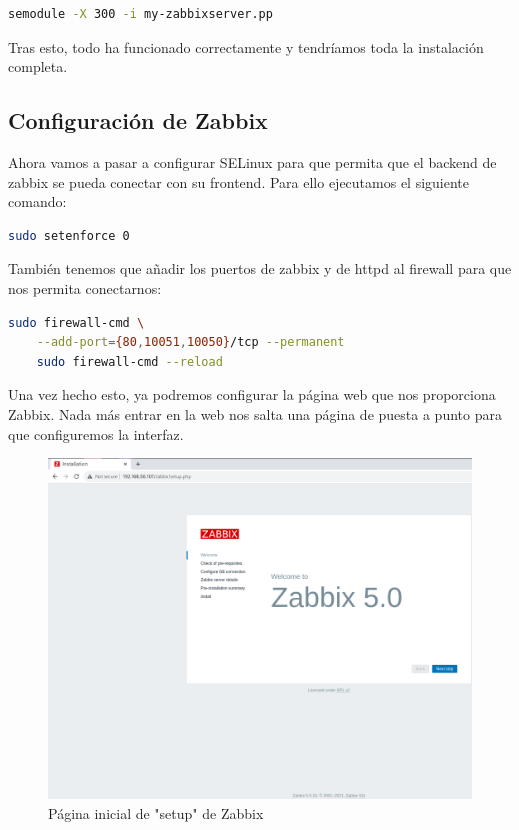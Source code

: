 \begin{lstlisting}[language=bash]
	semodule -X 300 -i my-zabbixserver.pp
\end{lstlisting}

Tras esto, todo ha funcionado correctamente y tendríamos toda la instalación completa.

\subsection{Configuración de Zabbix}

Ahora vamos a pasar a configurar SELinux para que permita que el backend de zabbix se pueda conectar con su frontend. Para ello ejecutamos el siguiente comando:

\begin{lstlisting}[language=bash]
	sudo setenforce 0
\end{lstlisting}

También tenemos que añadir los puertos de zabbix y de httpd al firewall para que nos permita conectarnos:

\begin{lstlisting}[language=bash]
	sudo firewall-cmd \
	--add-port={80,10051,10050}/tcp --permanent
	sudo firewall-cmd --reload
\end{lstlisting}
Una vez hecho esto, ya podremos configurar la página web que nos proporciona Zabbix. Nada más entrar en la web nos salta una página de puesta a punto para que configuremos la interfaz.

\begin{figure}[H]
	\centering
	\includegraphics[scale=0.3]{graphics/img5}
	\caption{Página inicial de "setup" de Zabbix}
\end{figure}

